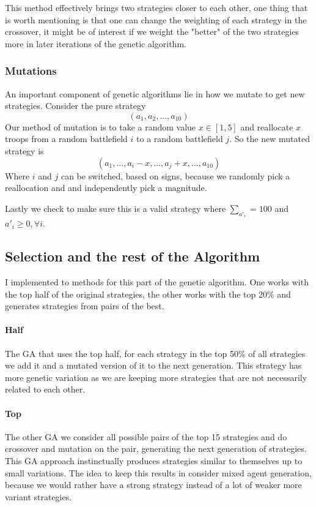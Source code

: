 \documentclass[12pt,letter]{article}
\begin{document}
This method effectively brings two strategies closer to each other, one thing that is worth mentioning is that one can change the weighting of each strategy in the crossover, it might be of interest if we weight the "better" of the two strategies more in later iterations of the genetic algorithm.

\subsubsection{Mutations}
An important component of genetic algorithms lie in how we mutate to get new strategies. Consider the pure strategy
\[(a_1, a_2, \dots, a_{10})\]
Our method of mutation is to take a random value $x \in [1, 5]$ and reallocate $x$ troops from a random battlefield $i$ to a random battlefield $j$. So the new mutated strategy is
\[(a_1, \dots, a_i - x, \dots, a_j + x, \dots, a_{10})\]
Where $i$ and $j$ can be switched, based on signs, because we randomly pick a reallocation and and independently pick a magnitude.

Lastly we check to make sure this is a valid strategy where $\sum_{a'_i} = 100$ and $a'_i \geq 0, \forall i$.

\subsection{Selection and the rest of the Algorithm}
I implemented to methods for this part of the genetic algorithm. One works with the top half of the original strategies, the other works with the top 20\% and generates strategies from pairs of the best.

\paragraph{Half} The GA that uses the top half, for each strategy in the top 50\% of all strategies we add it and a mutated version of it to the next generation. This strategy has more genetic variation as we are keeping more strategies that are not necessarily related to each other.

\paragraph{Top} The other GA we consider all possible pairs of the top 15 strategies and do crossover and mutation on the pair, generating the next generation of strategies. This GA approach instinctually produces strategies similar to themselves up to small variations. The idea to keep this results in consider mixed agent generation, because we would rather have a strong strategy instead of a lot of weaker more variant strategies.
\end{document}
